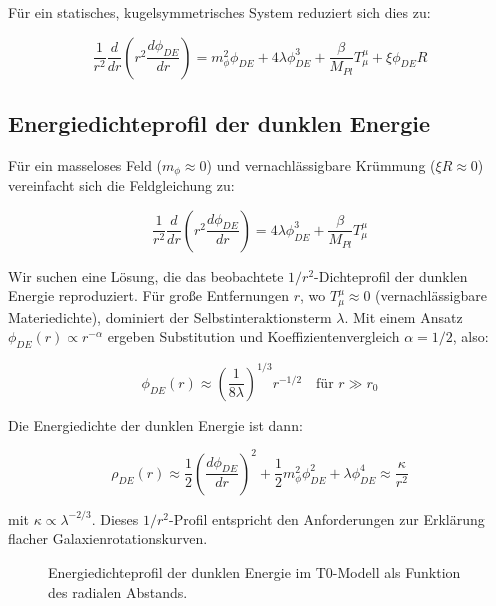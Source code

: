\documentclass[a4paper,12pt]{article}
\theoremstyle{definition}
\theoremstyle{remark}
\begin{document}
	Für ein statisches, kugelsymmetrisches System reduziert sich dies zu:
	
	\begin{equation}
		\frac{1}{r^2}\frac{d}{dr}\left(r^2\frac{d\phi_{DE}}{dr}\right) = m_{\phi}^2\phi_{DE} + 4\lambda\phi_{DE}^3 + \frac{\beta}{M_{Pl}}T^{\mu}_{\mu} + \xi \phi_{DE} R
	\end{equation}
	
	\subsection{Energiedichteprofil der dunklen Energie}
	Für ein masseloses Feld ($m_{\phi} \approx 0$) und vernachlässigbare Krümmung ($\xi R \approx 0$) vereinfacht sich die Feldgleichung zu:
	
	\begin{equation}
		\frac{1}{r^2}\frac{d}{dr}\left(r^2\frac{d\phi_{DE}}{dr}\right) = 4\lambda\phi_{DE}^3 + \frac{\beta}{M_{Pl}}T^{\mu}_{\mu}
	\end{equation}
	
	Wir suchen eine Lösung, die das beobachtete $1/r^2$-Dichteprofil der dunklen Energie reproduziert. Für große Entfernungen $r$, wo $T^{\mu}_{\mu} \approx 0$ (vernachlässigbare Materiedichte), dominiert der Selbstinteraktionsterm $\lambda$. Mit einem Ansatz $\phi_{DE}(r) \propto r^{-\alpha}$ ergeben Substitution und Koeffizientenvergleich $\alpha = 1/2$, also:
	
	\begin{equation}
		\phi_{DE}(r) \approx \left(\frac{1}{8\lambda}\right)^{1/3} r^{-1/2} \quad \text{für } r \gg r_0
	\end{equation}
	
	Die Energiedichte der dunklen Energie ist dann:
	
	\begin{equation}
		\rho_{DE}(r) \approx \frac{1}{2}\left(\frac{d\phi_{DE}}{dr}\right)^2 + \frac{1}{2}m_{\phi}^2\phi_{DE}^2 + \lambda\phi_{DE}^4 \approx \frac{\kappa}{r^2}
	\end{equation}
	
	mit $\kappa \propto \lambda^{-2/3}$. Dieses $1/r^2$-Profil entspricht den Anforderungen zur Erklärung flacher Galaxienrotationskurven.
	
	\begin{figure}[h]
		\centering
		\caption{Energiedichteprofil der dunklen Energie im T0-Modell als Funktion des radialen Abstands.}
	\end{figure}
	
\end{document}

